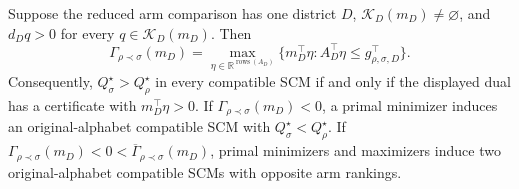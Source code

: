 Suppose the reduced arm comparison has one district \(D\), \(\mathcal K_D(m_D)\ne\varnothing\), and \(d_Dq>0\) for every \(q\in\mathcal K_D(m_D)\). Then \[\Gamma_{\rho\prec\sigma}(m_D)=\max_{\eta\in\mathbb R^{\operatorname{rows}(A_D)}}\{m_D^\top\eta:A_D^\top\eta\le g_{\rho,\sigma,D}^\top\}.\] Consequently, \(Q_\sigma^\star>Q_\rho^\star\) in every compatible SCM if and only if the displayed dual has a certificate with \(m_D^\top\eta>0\). If \(\Gamma_{\rho\prec\sigma}(m_D)<0\), a primal minimizer induces an original-alphabet compatible SCM with \(Q_\sigma^\star<Q_\rho^\star\). If \(\Gamma_{\rho\prec\sigma}(m_D)<0<\overline\Gamma_{\rho\prec\sigma}(m_D)\), primal minimizers and maximizers induce two original-alphabet compatible SCMs with opposite arm rankings.